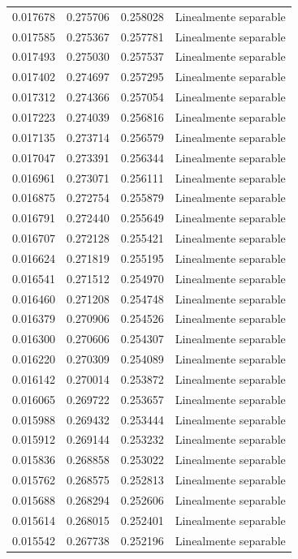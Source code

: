 \begin{tabular}{llll}
0.017678 & 0.275706 & 0.258028 & Linealmente separable \\
0.017585 & 0.275367 & 0.257781 & Linealmente separable \\
0.017493 & 0.275030 & 0.257537 & Linealmente separable \\
0.017402 & 0.274697 & 0.257295 & Linealmente separable \\
0.017312 & 0.274366 & 0.257054 & Linealmente separable \\
0.017223 & 0.274039 & 0.256816 & Linealmente separable \\
0.017135 & 0.273714 & 0.256579 & Linealmente separable \\
0.017047 & 0.273391 & 0.256344 & Linealmente separable \\
0.016961 & 0.273071 & 0.256111 & Linealmente separable \\
0.016875 & 0.272754 & 0.255879 & Linealmente separable \\
0.016791 & 0.272440 & 0.255649 & Linealmente separable \\
0.016707 & 0.272128 & 0.255421 & Linealmente separable \\
0.016624 & 0.271819 & 0.255195 & Linealmente separable \\
0.016541 & 0.271512 & 0.254970 & Linealmente separable \\
0.016460 & 0.271208 & 0.254748 & Linealmente separable \\
0.016379 & 0.270906 & 0.254526 & Linealmente separable \\
0.016300 & 0.270606 & 0.254307 & Linealmente separable \\
0.016220 & 0.270309 & 0.254089 & Linealmente separable \\
0.016142 & 0.270014 & 0.253872 & Linealmente separable \\
0.016065 & 0.269722 & 0.253657 & Linealmente separable \\
0.015988 & 0.269432 & 0.253444 & Linealmente separable \\
0.015912 & 0.269144 & 0.253232 & Linealmente separable \\
0.015836 & 0.268858 & 0.253022 & Linealmente separable \\
0.015762 & 0.268575 & 0.252813 & Linealmente separable \\
0.015688 & 0.268294 & 0.252606 & Linealmente separable \\
0.015614 & 0.268015 & 0.252401 & Linealmente separable \\
0.015542 & 0.267738 & 0.252196 & Linealmente separable \\

\end{tabular}
